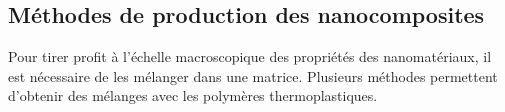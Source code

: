 %
%
%

\subsection{Méthodes de production des nanocomposites}

Pour tirer profit à l'échelle macroscopique des propriétés des nanomatériaux, il est nécessaire de les mélanger dans une matrice. 
Plusieurs méthodes permettent d'obtenir des mélanges avec les polymères thermoplastiques. 

